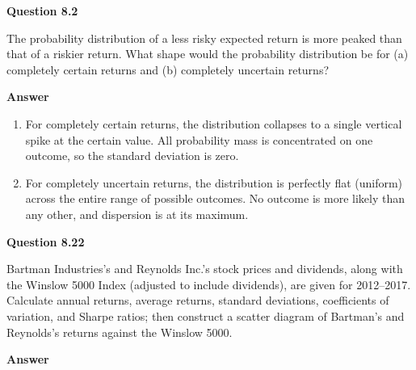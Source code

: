 \documentclass[11pt]{article}
\begin{document}
\textbf{Question 8.2}
\bigskip

The probability distribution of a less risky expected return is more peaked than that of a riskier return. What shape would the probability distribution be for (a) completely certain returns and (b) completely uncertain returns?

\bigskip
\textbf{Answer}

\begin{enumerate}
  \item[a.] For completely certain returns, the distribution collapses to a single vertical spike at the certain value. All probability mass is concentrated on one outcome, so the standard deviation is zero.
  \item[b.] For completely uncertain returns, the distribution is perfectly flat (uniform) across the entire range of possible outcomes. No outcome is more likely than any other, and dispersion is at its maximum.
\end{enumerate}

\bigskip
\bigskip

\textbf{Question 8.22}
\bigskip

Bartman Industries's and Reynolds Inc.'s stock prices and dividends, along with the Winslow 5000 Index (adjusted to include dividends), are given for 2012--2017. Calculate annual returns, average returns, standard deviations, coefficients of variation, and Sharpe ratios; then construct a scatter diagram of Bartman's and Reynolds's returns against the Winslow 5000.

\bigskip
\textbf{Answer}
\end{document}
